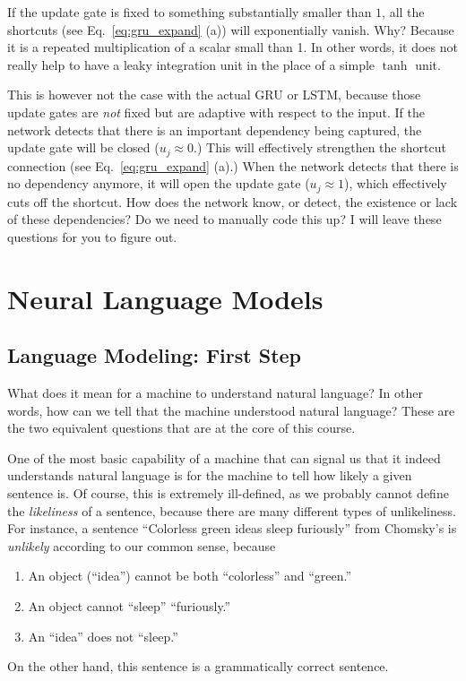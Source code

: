 \documentclass{report}
\begin{document}
If the update gate is fixed to something substantially smaller than $1$, all the
shortcuts (see Eq.~\eqref{eq:gru_expand} (a)) will exponentially vanish. Why?
Because it is a repeated multiplication of a scalar small than 1. In other
words, it does not really help to have a leaky integration unit in the place of
a simple $\tanh$ unit.

This is however not the case with the actual GRU or LSTM, because those update
gates are {\em not} fixed but are adaptive with respect to the input. If the
network detects that there is an important dependency being captured, the update
gate will be closed ($u_j \approx 0$.) This will effectively strengthen the
shortcut connection (see Eq.~\eqref{eq:gru_expand} (a).) When the network
detects that there is no dependency anymore, it will open the update gate ($u_j
\approx 1$), which effectively cuts off the shortcut. How does the network know,
or detect, the existence or lack of these dependencies? Do we need to manually
code this up? I will leave these questions for you to figure out.


\chapter{Neural Language Models}
\label{chap:nlm}

\section{Language Modeling: First Step}

What does it mean for a machine to understand natural language? In other words,
how can we tell that the machine understood natural language?  These are the two
equivalent questions that are at the core of this course. 

One of the most basic capability of a machine that can signal us that it indeed
understands natural language is for the machine to tell how likely a given
sentence is. Of course, this is extremely ill-defined, as we probably cannot
define the {\em likeliness} of a sentence, because there are many different
types of unlikeliness. For instance, a sentence ``Colorless green ideas sleep
furiously'' from Chomsky's \cite{chomsky2002syntactic} is {\em unlikely}
according to our common sense, because 
\begin{enumerate}
    \itemsep 0em
    \item An object (``idea'') cannot be both ``colorless'' and ``green.''
    \item An object cannot ``sleep'' ``furiously.''
    \item An ``idea'' does not ``sleep.''
\end{enumerate}
On the other hand, this sentence is a grammatically correct sentence.
\end{document}
